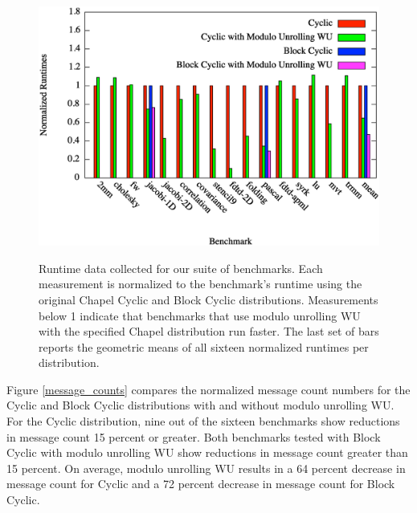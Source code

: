\begin{figure}
\begin{center}
\includegraphics[width=\linewidth]{./Figures/runtimes}
\renewcommand{\baselinestretch}{1}
\small\normalsize
\begin{quote}
\caption[Benchmark suite evaluation: runtime data]{Runtime data collected for our suite of benchmarks. Each measurement is normalized to the benchmark's runtime using the original Chapel Cyclic and Block Cyclic distributions. Measurements below 1 indicate that benchmarks that use modulo unrolling WU with the specified Chapel distribution run faster. The last set of bars reports the geometric means of all sixteen normalized runtimes per distribution. \label{runtimes}}
\end{quote}
\end{center}
\end{figure}

Figure \ref{message_counts} compares the normalized message count numbers for the Cyclic and Block Cyclic distributions with and without modulo unrolling WU. For the Cyclic distribution, nine out of the sixteen benchmarks show reductions in message count 15 percent or greater. Both benchmarks tested with Block Cyclic with modulo unrolling WU show reductions in message count greater than 15 percent. On average, modulo unrolling WU results in a 64 percent decrease in message count for Cyclic and a 72 percent decrease in message count for Block Cyclic. 

